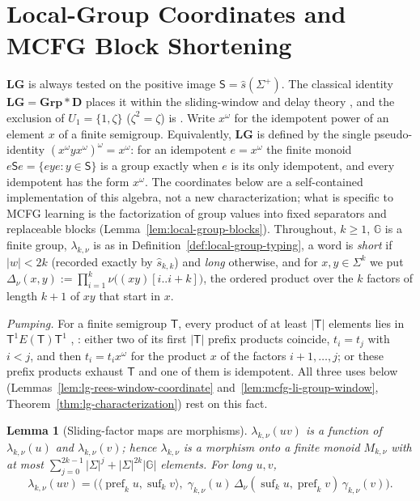 \documentclass[11pt]{article}
\numberwithin{equation}{section}
\theoremstyle{plain}
\newtheorem{lemma}[theorem]{Lemma}
\theoremstyle{definition}
\theoremstyle{remark}
\theoremstyle{plain}
\begin{document}
\section{Local-Group Coordinates and MCFG Block Shortening}
\label{app:local-group}

$\mathbf{LG}$ is always tested on the positive image $\mathsf S=\widehat s(\Sigma^+)$.  The
classical identity $\mathbf{LG}=\mathbf{Grp}*\mathbf D$ places it within the
sliding-window and delay theory \cite{Straubing1985,Tilson1987}, and the exclusion of
$U_1=\{1,\zeta\}$ ($\zeta^2=\zeta$) is \cite[Proposition~2.3]{AlmeidaEtAl2009}.
Write $x^\omega$ for the idempotent power of an element $x$ of a finite semigroup.
Equivalently, $\mathbf{LG}$ is defined by the single pseudo-identity
$(x^\omega yx^\omega)^\omega=x^\omega$: for an idempotent $e=x^\omega$ the finite monoid
$e\mathsf Se=\{eye:y\in\mathsf S\}$ is a group exactly when $e$ is its only idempotent, and
every idempotent has the form $x^\omega$.
The coordinates below are a self-contained implementation of this algebra, not a
new characterization; what is specific to MCFG learning is the factorization of group
values into fixed separators and replaceable blocks
(Lemma~\ref{lem:local-group-blocks}).  Throughout, $k\ge1$, ${\mathbb G}$ is a finite group,
$\lambda_{k,\nu}$ is as in Definition~\ref{def:local-group-typing}, a word is
\emph{short} if $|w|<2k$ (recorded exactly by $\widehat s_{k,k}$) and \emph{long}
otherwise, and for $x,y\in\Sigma^k$ we put
$\Delta_\nu(x,y):=\prod_{i=1}^{k}\nu\bigl((xy)[i..i+k]\bigr)$, the ordered product over
the $k$ factors of length $k+1$ of $xy$ that start in $x$.

\emph{Pumping.}  For a finite semigroup $\mathsf T$, every product of at least
$|\mathsf T|$ elements lies in $\mathsf T^1E(\mathsf T)\mathsf T^1$
\cite[Lemma~2.2]{AlmeidaEtAl2009}, \cite{Pin1986}: either two of its first
$|\mathsf T|$ prefix products coincide, $t_i=t_j$ with $i<j$, and then
$t_i=t_ix^\omega$ for the product $x$ of the factors $i+1,\ldots,j$; or these prefix
products exhaust $\mathsf T$ and one of them is idempotent.  All three uses below
(Lemmas~\ref{lem:lg-rees-window-coordinate} and~\ref{lem:mcfg-li-group-window},
Theorem~\ref{thm:lg-characterization}) rest on this fact.

\begin{lemma}[Sliding-factor maps are morphisms]
\label{lem:local-group-morphism}
$\lambda_{k,\nu}(uv)$ is a function of $\lambda_{k,\nu}(u)$ and $\lambda_{k,\nu}(v)$;
hence $\lambda_{k,\nu}$ is a morphism onto a finite monoid $M_{k,\nu}$ with at most
$\sum_{j=0}^{2k-1}|\Sigma|^j+|\Sigma|^{2k}|{\mathbb G}|$ elements.  For long $u,v$,
\[
 \lambda_{k,\nu}(uv)
 =\bigl(\langle\operatorname{pref}_ku,\operatorname{suf}_kv\rangle,\;
   \gamma_{k,\nu}(u)\,\Delta_\nu(\operatorname{suf}_ku,\operatorname{pref}_kv)\,
   \gamma_{k,\nu}(v)\bigr).
\]
\end{lemma}
\end{document}
